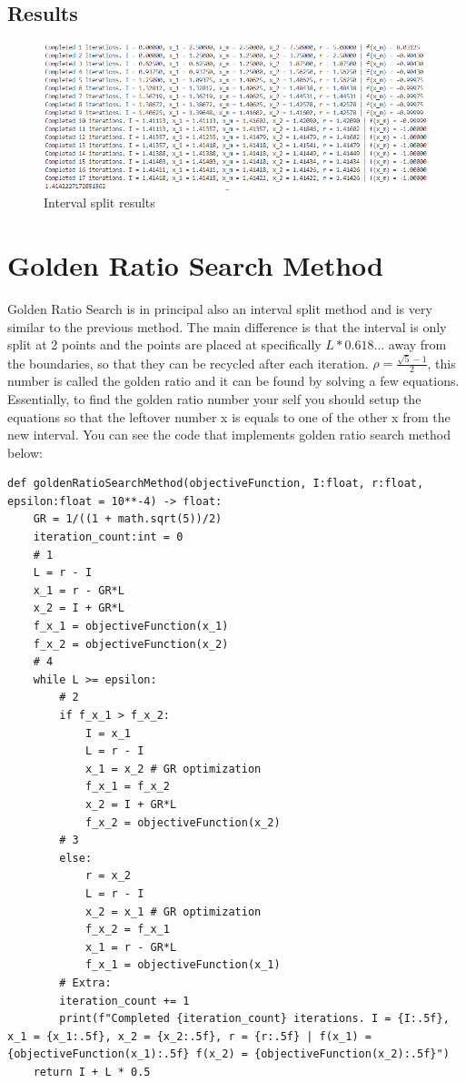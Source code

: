 \documentclass{article}
\begin{document}
        \subsection*{Results}
            \begin{figure}[H]
                \centering
                \includegraphics[width=1\textwidth]{interval.png}
                \caption{Interval split results}
                \label{fig:ml}
            \end{figure}
    \section{Golden Ratio Search Method}
        Golden Ratio Search is in principal also an interval split method and is very similar to the previous method. The main difference is that the interval is only split at 2 points and the points are placed at specifically $L * 0.618...$ away from the boundaries, so that they can be recycled after each iteration. $\rho = \frac{\sqrt{5} - 1}{2}$, this number is called the golden ratio and it can be found by solving a few equations. Essentially, to find the golden ratio number your self you should setup the equations so that the leftover number x is equals to one of the other x from the new interval. You can see the code that implements golden ratio search method below:
        \begin{verbatim}
def goldenRatioSearchMethod(objectiveFunction, I:float, r:float, epsilon:float = 10**-4) -> float:
    GR = 1/((1 + math.sqrt(5))/2)
    iteration_count:int = 0
    # 1
    L = r - I
    x_1 = r - GR*L
    x_2 = I + GR*L
    f_x_1 = objectiveFunction(x_1)
    f_x_2 = objectiveFunction(x_2)
    # 4
    while L >= epsilon:
        # 2
        if f_x_1 > f_x_2:
            I = x_1
            L = r - I
            x_1 = x_2 # GR optimization
            f_x_1 = f_x_2
            x_2 = I + GR*L
            f_x_2 = objectiveFunction(x_2)
        # 3
        else:
            r = x_2
            L = r - I
            x_2 = x_1 # GR optimization
            f_x_2 = f_x_1
            x_1 = r - GR*L
            f_x_1 = objectiveFunction(x_1)
        # Extra:
        iteration_count += 1
        print(f"Completed {iteration_count} iterations. I = {I:.5f}, x_1 = {x_1:.5f}, x_2 = {x_2:.5f}, r = {r:.5f} | f(x_1) = {objectiveFunction(x_1):.5f} f(x_2) = {objectiveFunction(x_2):.5f}")
    return I + L * 0.5
    \end{verbatim}
\end{document}
